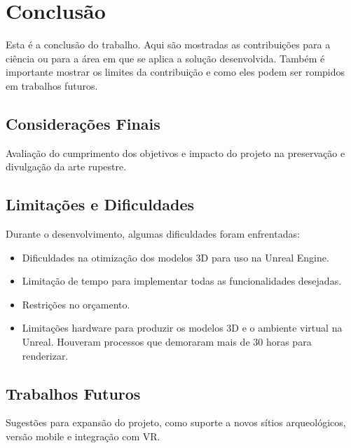 \chapter{Conclusão}
\label{Conclusao}

Esta é a conclusão do trabalho. 
Aqui são mostradas as contribuições para a ciência ou para a área em que se aplica a solução desenvolvida.
Também é importante mostrar os limites da contribuição e como eles podem ser rompidos em trabalhos futuros.

\section{Considerações Finais}
\label{sec:consideracoes_finais}
Avaliação do cumprimento dos objetivos e impacto do projeto na preservação e divulgação da arte rupestre.


\section{Limitações e Dificuldades}
\label{sec:limitações}
Durante o desenvolvimento, algumas dificuldades foram enfrentadas:
\begin{itemize}
    \item Dificuldades na otimização dos modelos 3D para uso na Unreal Engine.
    \item Limitação de tempo para implementar todas as funcionalidades desejadas.
    \item Restrições no orçamento.
    \item Limitações hardware para produzir os modelos 3D e o ambiente virtual na Unreal. Houveram processos que demoraram mais de 30 horas para renderizar.
\end{itemize}

\section{Trabalhos Futuros}
\label{sec:trabalhos_futuros}
Sugestões para expansão do projeto, como suporte a novos sítios arqueológicos, versão mobile e integração com VR.
